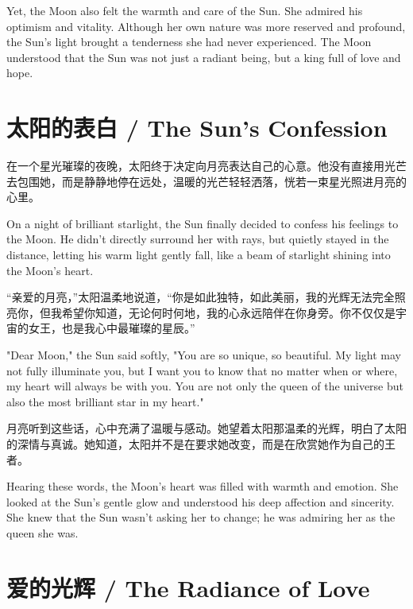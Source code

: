 \begin{flushright}
Yet, the Moon also felt the warmth and care of the Sun. She admired his optimism and vitality. Although her own nature was more reserved and profound, the Sun’s light brought a tenderness she had never experienced. The Moon understood that the Sun was not just a radiant being, but a king full of love and hope.
\end{flushright}

\section*{太阳的表白 / The Sun’s Confession}

在一个星光璀璨的夜晚，太阳终于决定向月亮表达自己的心意。他没有直接用光芒去包围她，而是静静地停在远处，温暖的光芒轻轻洒落，恍若一束星光照进月亮的心里。

\begin{flushright}
On a night of brilliant starlight, the Sun finally decided to confess his feelings to the Moon. He didn’t directly surround her with rays, but quietly stayed in the distance, letting his warm light gently fall, like a beam of starlight shining into the Moon’s heart.
\end{flushright}

“亲爱的月亮，”太阳温柔地说道，“你是如此独特，如此美丽，我的光辉无法完全照亮你，但我希望你知道，无论何时何地，我的心永远陪伴在你身旁。你不仅仅是宇宙的女王，也是我心中最璀璨的星辰。”

\begin{flushright}
"Dear Moon," the Sun said softly, "You are so unique, so beautiful. My light may not fully illuminate you, but I want you to know that no matter when or where, my heart will always be with you. You are not only the queen of the universe but also the most brilliant star in my heart."
\end{flushright}

月亮听到这些话，心中充满了温暖与感动。她望着太阳那温柔的光辉，明白了太阳的深情与真诚。她知道，太阳并不是在要求她改变，而是在欣赏她作为自己的王者。

\begin{flushright}
Hearing these words, the Moon’s heart was filled with warmth and emotion. She looked at the Sun’s gentle glow and understood his deep affection and sincerity. She knew that the Sun wasn’t asking her to change; he was admiring her as the queen she was.
\end{flushright}

\section*{爱的光辉 / The Radiance of Love}

